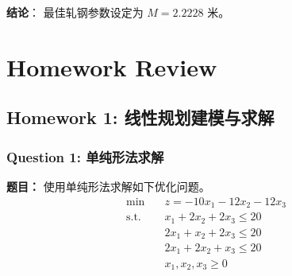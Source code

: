 \documentclass[a4paper,12pt]{ctexart} %
\begin{document}
	\textbf{结论}：
	最佳轧钢参数设定为 $M = 2.2228$ 米。
	
	\newpage
	
	\section{Homework Review}
	
	\subsection{Homework 1: 线性规划建模与求解}
	
	\subsubsection*{Question 1: 单纯形法求解}
	\textbf{题目：} 使用单纯形法求解如下优化问题。
	\[
	\begin{aligned}
		\min \quad & z = -10x_{1}-12x_{2}-12x_{3} \\
		\text{s.t.} \quad & x_{1}+2x_{2}+2x_{3}\le 20 \\
		& 2x_{1}+x_{2}+2x_{3}\le 20 \\
		& 2x_{1}+2x_{2}+x_{3}\le 20 \\
		& x_{1}, x_{2}, x_{3} \ge 0
	\end{aligned}
	\]
	
\end{document}
